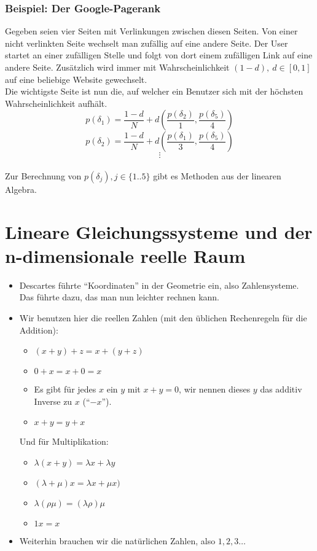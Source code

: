 \documentclass{report}
\newcommand{\lb}{\lambda}
\theoremstyle{customrem}
\theoremstyle{customdef}
\theoremstyle{customenv}
\begin{document}
	\subsection*{Beispiel: Der Google-Pagerank}
	Gegeben seien vier Seiten mit Verlinkungen zwischen diesen Seiten. Von einer nicht verlinkten Seite wechselt man zufällig auf eine andere Seite. Der User startet an einer zufälligen Stelle und folgt von dort einem zufälligen Link auf eine andere Seite. Zusätzlich wird immer mit Wahrscheinlichkeit \((1-d), \ d \in [0, 1]\) auf eine beliebige Website gewechselt.\\
	Die wichtigste Seite ist nun die, auf welcher ein Benutzer sich mit der höchsten Wahrscheinlichkeit aufhält.\\
	\[
	p(\delta_1) = \frac{1-d}{N} + d\left(\frac{p(\delta_2)}{1}, \frac{p(\delta_5)}{4}\right)\]\[
	p(\delta_2) = \frac{1-d}{N} + d\left(\frac{p(\delta_1)}{3}, \frac{p(\delta_5)}{4}\right)\]\[
	\vdots
	\]\\
	Zur Berechnung von \(p(\delta_j), j \in \{1..5\}\) gibt es Methoden aus der linearen Algebra.
	\newpage
	\tableofcontents
	\newpage
	\chapter[Lineare Gleichungssysteme und der n-dimensionale reelle Raum]{Lineare Gleichungssysteme und der \\ n-dimensionale reelle Raum}
	
	\begin{itemize}
		\item Descartes führte "`Koordinaten"' in der Geometrie ein, also Zahlensysteme. Das führte dazu, das man nun leichter rechnen kann.
		\item Wir benutzen hier die reellen Zahlen (mit den üblichen Rechenregeln für die Addition):
		\begin{itemize}
			\item \((x + y) + z = x + (y + z)\) 
			\item \(0 + x = x + 0 = x\) 
			\item Es gibt für jedes \(x\) ein \(y\) mit \(x + y = 0\), wir nennen dieses \(y\) das additiv Inverse zu \(x\) ("`\(-x\)"').
			\item \(x + y = y + x\)
		\end{itemize}
		Und für Multiplikation:
		\begin{itemize}
			\item \(\lambda (x + y) = \lambda x + \lambda y\) 
			\item \((\lambda + \mu) x = \lambda x + \mu x)\)
			\item \(\lb(\rho\mu)=(\lb\rho)\mu\)
			\item \(1x = x\)
		\end{itemize}
		\item Weiterhin brauchen wir die natürlichen Zahlen, also \(1,2,3\dots\)
	\end{itemize}
	
\end{document}
